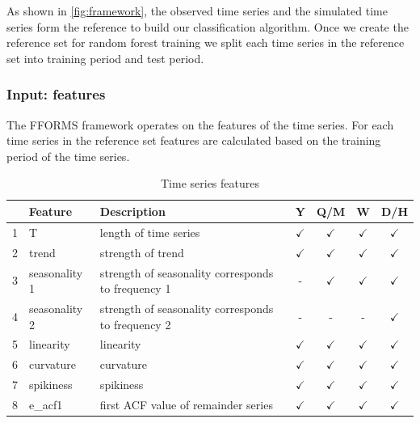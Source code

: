 \documentclass[11pt,a4paper,]{article}
\def\yes{$\checkmark$}
\theoremstyle{definition}
\theoremstyle{definition}
\theoremstyle{definition}
\theoremstyle{remark}
\begin{document}
As shown in \autoref{fig:framework}, the observed time series and the
simulated time series form the reference to build our classification
algorithm. Once we create the reference set for random forest training
we split each time series in the reference set into training period and
test period.

\subsubsection{Input: features}\label{input-features}

The FFORMS framework operates on the features of the time series. For
each time series in the reference set features are calculated based on
the training period of the time series.

\begin{table}[!htp]
\centering\footnotesize\tabcolsep=0.12cm
\caption{Time series features}
\label{feature}
\begin{tabular}{llp{}cccc}
\toprule
\multicolumn{2}{c}{Feature} & Description & Y & Q/M & W & D/H\\
\midrule
1  & T              & length of time series                                                                   & \yes  & \yes & \yes & \yes\\
2  & trend          & strength of trend                                                                       & \yes  & \yes & \yes & \yes\\
3  & seasonality 1    & strength of seasonality corresponds to frequency 1                                                              & -     & \yes & \yes & \yes\\
4  & seasonality 2    & strength of seasonality corresponds to frequency 2                                                              & -     & - & -& \yes\\
5  & linearity      & linearity                                                                               & \yes  & \yes & \yes & \yes\\
6  & curvature      & curvature                                                                               & \yes  & \yes & \yes & \yes\\
7  & spikiness      & spikiness                                                                               & \yes  & \yes & \yes & \yes\\
8  & e\_acf1        & first ACF value of remainder series                                                     & \yes  & \yes & \yes & \yes\\

\end{tabular}
\end{table}
\end{document}
